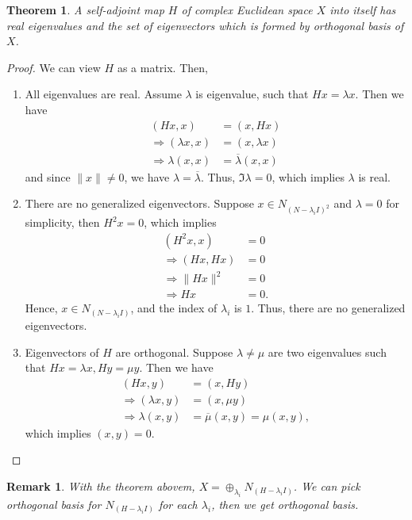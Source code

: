 \documentclass[11pt]{book}
\newtheorem{theorem}{Theorem}[section]
\newtheorem{remark}{Remark}[section]
\theoremstyle{definition}
\numberwithin{equation}{subsection}
\begin{document}
\begin{theorem}\label{theorem_hermitian}
A self-adjoint map $H$ of complex Euclidean space $X$ into itself has real eigenvalues and the set of eigenvectors which is formed by orthogonal basis of $X$.
\end{theorem}
\begin{proof}
We can view $H$ as a matrix. Then,
\begin{enumerate}[label=(\roman*)]
    \item All eigenvalues are real. Assume $\lambda$ is eigenvalue, such that $Hx = \lambda x$. Then we have
    \begin{align*}
        (Hx, x) & = (x, Hx) \\
        \Rightarrow (\lambda x, x) & = (x, \lambda x) \\
        \Rightarrow \lambda (x, x) & = \overline{\lambda} (x, x)
    \end{align*}
    and since $\|x\|\neq 0$, we have $\lambda = \overline{\lambda}$. Thus, $\Im \lambda = 0$, which implies $\lambda$ is real.
    \item There are no generalized eigenvectors. Suppose $x\in N_{(N - \lambda_i I)^2}$ and $\lambda = 0$ for simplicity, then $H^2 x = 0$, which implies
    \begin{align*}
        (H^2 x, x) & = 0 \\
        \Rightarrow (Hx, Hx) & = 0 \\
        \Rightarrow \|Hx\|^2 & = 0 \\
        \Rightarrow Hx & = 0.
    \end{align*}
    Hence, $x\in N_{(N - \lambda_i I)}$, and the index of $\lambda_i$ is $1$. Thus, there are no generalized eigenvectors.
    \item Eigenvectors of $H$ are orthogonal. Suppose $\lambda \neq \mu$ are two eigenvalues such that $Hx = \lambda x, Hy = \mu y$. Then we have
    \begin{align*}
        (Hx, y) & = (x, Hy) \\
        \Rightarrow (\lambda x, y) & = (x, \mu y) \\
        \Rightarrow \lambda(x, y) & = \overline{\mu} (x, y) = \mu (x, y),
    \end{align*}
    which implies $(x,y) = 0$. 
\end{enumerate}
\end{proof}

\begin{remark}
With the theorem abovem, $X = \oplus_{\lambda_i}N_{(H-\lambda_i I)}$. We can pick orthogonal basis for $N_{(H-\lambda_i I)}$ for each $\lambda_i$, then we get orthogonal basis.
\end{remark}
\end{document}
